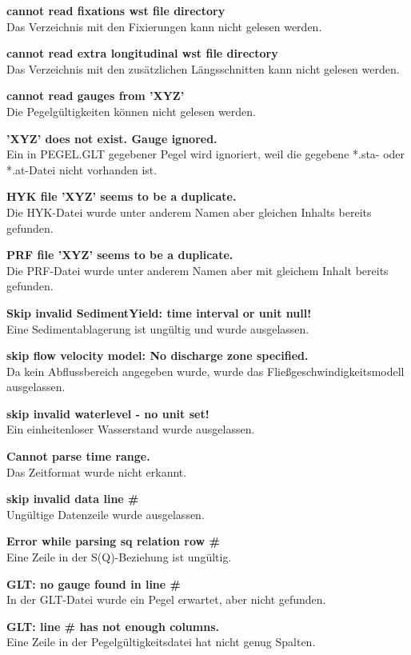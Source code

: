\textbf{cannot read fixations wst file directory}
\\Das Verzeichnis mit den Fixierungen kann nicht gelesen werden.

\textbf{cannot read extra longitudinal wst file directory}
\\Das Verzeichnis mit den zusätzlichen Längsschnitten kann nicht gelesen werden.

\textbf{cannot read gauges from 'XYZ'}
\\Die Pegelgültigkeiten können nicht gelesen werden.

\textbf{'XYZ' does not exist. Gauge ignored.}
\\Ein in PEGEL.GLT gegebener Pegel wird ignoriert,
weil die gegebene *.sta- oder *.at-Datei nicht vorhanden ist.

\textbf{HYK file 'XYZ' seems to be a duplicate.}
\\Die HYK-Datei wurde unter anderem Namen aber gleichen Inhalts bereits
gefunden.

\textbf{PRF file 'XYZ' seems to be a duplicate.}
\\Die PRF-Datei wurde unter anderem Namen aber mit gleichem Inhalt bereits
gefunden.

\textbf{Skip invalid SedimentYield: time interval or unit null!}
\\Eine Sedimentablagerung ist ungültig und wurde ausgelassen.

\textbf{skip flow velocity model: No discharge zone specified.}
\\Da kein Abflussbereich angegeben wurde, wurde das Fließgeschwindigkeitsmodell ausgelassen.

\textbf{skip invalid waterlevel - no unit set!}
\\Ein einheitenloser Wasserstand wurde ausgelassen.

\textbf{Cannot parse time range.}
\\Das Zeitformat wurde nicht erkannt.

\textbf{skip invalid data line \#}
\\Ungültige Datenzeile wurde ausgelassen.

\textbf{Error while parsing sq relation row \#}
\\Eine Zeile in der S(Q)-Beziehung ist ungültig.

\textbf{GLT: no gauge found in line \#}
\\In der GLT-Datei wurde ein Pegel erwartet, aber nicht gefunden.

\textbf{GLT: line \# has not enough columns.}
\\Eine Zeile in der Pegelgültigkeitsdatei hat nicht genug Spalten.

